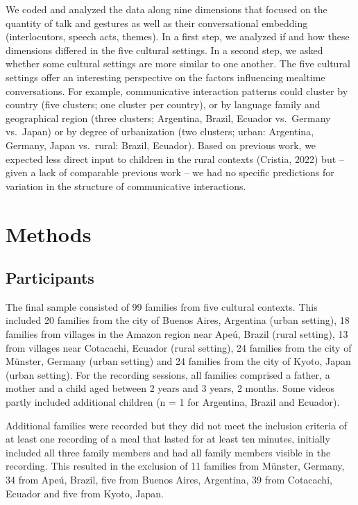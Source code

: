 \documentclass[
  man,floatsintext]{apa6}
\begin{document}
We coded and analyzed the data along nine dimensions that focused on the quantity of talk and gestures as well as their conversational embedding (interlocutors, speech acts, themes). In a first step, we analyzed if and how these dimensions differed in the five cultural settings. In a second step, we asked whether some cultural settings are more similar to one another. The five cultural settings offer an interesting perspective on the factors influencing mealtime conversations. For example, communicative interaction patterns could cluster by country (five clusters; one cluster per country), or by language family and geographical region (three clusters; Argentina, Brazil, Ecuador vs.~Germany vs.~Japan) or by degree of urbanization (two clusters; urban: Argentina, Germany, Japan vs.~rural: Brazil, Ecuador). Based on previous work, we expected less direct input to children in the rural contexts (Cristia, 2022) but -- given a lack of comparable previous work -- we had no specific predictions for variation in the structure of communicative interactions.

\hypertarget{methods}{%
\section{Methods}\label{methods}}

\hypertarget{participants}{%
\subsection{Participants}\label{participants}}

The final sample consisted of 99 families from five cultural contexts. This included 20 families from the city of Buenos Aires, Argentina (urban setting), 18 families from villages in the Amazon region near Apeú, Brazil (rural setting), 13 from villages near Cotacachi, Ecuador (rural setting), 24 families from the city of Münster, Germany (urban setting) and 24 families from the city of Kyoto, Japan (urban setting). For the recording sessions, all families comprised a father, a mother and a child aged between 2 years and 3 years, 2 months. Some videos partly included additional children (n = 1 for Argentina, Brazil and Ecuador).

Additional families were recorded but they did not meet the inclusion criteria of at least one recording of a meal that lasted for at least ten minutes, initially included all three family members and had all family members visible in the recording. This resulted in the exclusion of 11 families from Münster, Germany, 34 from Apeú, Brazil, five from Buenos Aires, Argentina, 39 from Cotacachi, Ecuador and five from Kyoto, Japan.
\end{document}
